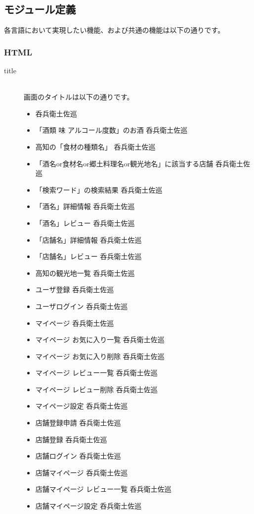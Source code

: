 \documentclass[a4j,titlepage]{jarticle}
\begin{document}
\clearpage

\subsection{モジュール定義}
各言語において実現したい機能、および共通の機能は以下の通りです。

\subsubsection{HTML}
\begin{description}
\item [title]~\\
画面のタイトルは以下の通りです。

\begin{itemize}
\item 呑兵衛土佐巡
\item 「酒類 味 アルコール度数」のお酒 呑兵衛土佐巡
\item 高知の「食材の種類名」 呑兵衛土佐巡
\item 「酒名or食材名or郷土料理名or観光地名」に該当する店舗 呑兵衛土佐巡
\item 「検索ワード」の検索結果 呑兵衛土佐巡
\item 「酒名」詳細情報 呑兵衛土佐巡
\item 「酒名」レビュー 呑兵衛土佐巡
\item 「店舗名」詳細情報 呑兵衛土佐巡
\item 「店舗名」レビュー 呑兵衛土佐巡
\item 高知の観光地一覧 呑兵衛土佐巡
\item ユーザ登録 呑兵衛土佐巡
\item ユーザログイン 呑兵衛土佐巡
\item マイページ 呑兵衛土佐巡
\item マイページ お気に入り一覧 呑兵衛土佐巡
\item マイページ お気に入り削除 呑兵衛土佐巡
\item マイページ レビュー一覧 呑兵衛土佐巡
\item マイページ レビュー削除 呑兵衛土佐巡
\item マイページ設定 呑兵衛土佐巡
\item 店舗登録申請 呑兵衛土佐巡
\item 店舗登録 呑兵衛土佐巡
\item 店舗ログイン 呑兵衛土佐巡
\item 店舗マイページ 呑兵衛土佐巡
\item 店舗マイページ レビュー一覧 呑兵衛土佐巡
\item 店舗マイページ設定 呑兵衛土佐巡
\end{itemize}


\end{description}
\end{document}
